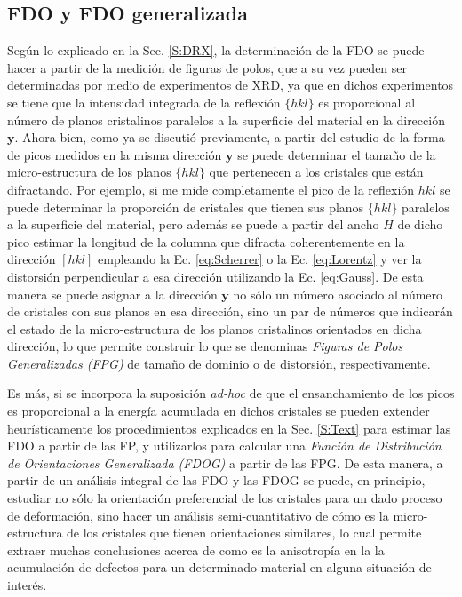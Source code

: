 \subsection{FDO y FDO generalizada}\label{SS:ODFG}
Según lo explicado en la Sec. \ref{S:DRX}, la determinación de la FDO se puede hacer a partir de la medición de figuras de polos, que a su vez pueden ser determinadas por medio de experimentos de XRD, ya que en dichos experimentos se tiene que la intensidad integrada de la reflexión $\{hkl\}$ es proporcional al número de planos cristalinos paralelos a  la superficie del material en la dirección $\mathbf{y}$.
Ahora bien, como ya se discutió previamente, a partir del estudio de la forma de picos medidos en la misma dirección $\mathbf{y}$ se puede determinar el tamaño de la micro-estructura de los planos $\{hkl\}$ que pertenecen a los cristales que están difractando.
Por ejemplo, si me mide completamente el pico de la reflexión $hkl$ se puede determinar la proporción de cristales que tienen sus planos $\{hkl\}$ paralelos a la superficie del material, pero además se puede a partir del ancho $H$ de dicho pico estimar la longitud de la columna que difracta coherentemente en la dirección $[hkl]$ empleando la Ec. \ref{eq:Scherrer} o la Ec. \ref{eq:Lorentz} y ver la distorsión perpendicular a esa dirección utilizando la Ec. \ref{eq:Gauss}.
De esta manera se puede asignar a la dirección $\mathbf{y}$ no sólo un número asociado al número de cristales con sus planos en esa dirección, sino un par de números que indicarán el estado de la micro-estructura de los planos cristalinos orientados en dicha dirección, lo que permite construir lo que se denominas \textit{Figuras de Polos Generalizadas (FPG)} de tamaño de dominio o de distorsión, respectivamente.

Es más, si se incorpora la suposición \textit{ad-hoc} de que el ensanchamiento de los picos es proporcional a la energía acumulada en dichos cristales se pueden extender heurísticamente los procedimientos explicados en la Sec. \ref{S:Text} para estimar las FDO a partir de las FP, y utilizarlos para calcular una \textit{Función de Distribución de Orientaciones Generalizada (FDOG)} a partir de las FPG. 
De esta manera, a partir de un análisis integral de las FDO y las FDOG se puede, en principio, estudiar no sólo la orientación preferencial de los cristales para un dado proceso de deformación, sino hacer un análisis semi-cuantitativo de cómo es la micro-estructura de los cristales que tienen orientaciones similares, lo cual permite extraer muchas conclusiones acerca de como es la anisotropía en la la acumulación de defectos para un determinado material en alguna situación de interés. 

